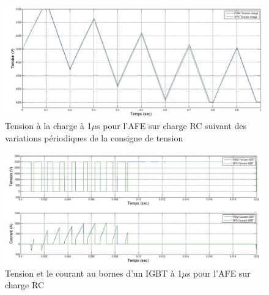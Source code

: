 \begin{figure}[htb]
\centering
\includegraphics[scale=0.5]{fig/ten_afe.jpg}
\caption{Tension à la charge à 1$\mu$s pour l'AFE sur charge RC suivant des variations périodiques de la consigne de tension}
\label{AF_RC_ten}
\end{figure}



\begin{figure}[htb]
\centering
\includegraphics[scale=0.5]{fig/com_afe.jpg}
\caption{Tension et le courant au bornes d'un IGBT à 1$\mu$s pour l'AFE sur charge RC}
\label{AF_RC_igbt}
\end{figure}

\clearpage

